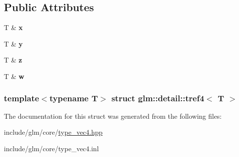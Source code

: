 \subsection*{\-Public \-Attributes}
\begin{DoxyCompactItemize}
\item 
\hypertarget{structglm_1_1detail_1_1tref4_ab32630a2702b20d2c40cda8e2f656908}{\-T \& {\bfseries x}}\label{structglm_1_1detail_1_1tref4_ab32630a2702b20d2c40cda8e2f656908}

\item 
\hypertarget{structglm_1_1detail_1_1tref4_a6aa739c6a296a62be6affef3a364873a}{\-T \& {\bfseries y}}\label{structglm_1_1detail_1_1tref4_a6aa739c6a296a62be6affef3a364873a}

\item 
\hypertarget{structglm_1_1detail_1_1tref4_ac87b56230150da4d731b70dc1bafaccc}{\-T \& {\bfseries z}}\label{structglm_1_1detail_1_1tref4_ac87b56230150da4d731b70dc1bafaccc}

\item 
\hypertarget{structglm_1_1detail_1_1tref4_a697261241694b19906b807f17ed71582}{\-T \& {\bfseries w}}\label{structglm_1_1detail_1_1tref4_a697261241694b19906b807f17ed71582}

\end{DoxyCompactItemize}
\subsubsection*{template$<$typename \-T$>$ struct glm\-::detail\-::tref4$<$ T $>$}



\-The documentation for this struct was generated from the following files\-:\begin{DoxyCompactItemize}
\item 
include/glm/core/\hyperlink{type__vec4_8hpp}{type\-\_\-vec4.\-hpp}\item 
include/glm/core/type\-\_\-vec4.\-inl\end{DoxyCompactItemize}
